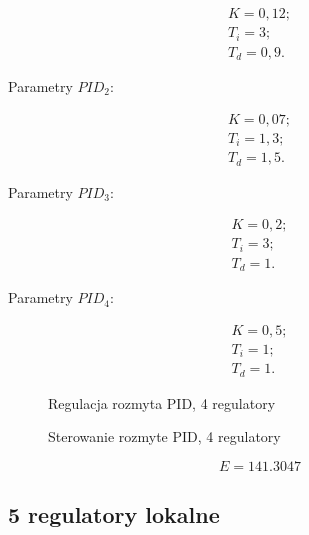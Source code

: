 \begin{equation}
\begin{matrix}
    	K = 0,12;\\
    	T_i = 3;\\
    	T_d = 0,9.
\end{matrix}
\end{equation}

Parametry $PID_2$:

\begin{equation}
\begin{matrix}
    	K = 0,07;\\
    	T_i = 1,3;\\
    	T_d = 1,5.
\end{matrix}
\end{equation}

Parametry $PID_3$:

\begin{equation}
\begin{matrix}
    	K = 0,2;\\
    	T_i = 3;\\
    	T_d = 1.
\end{matrix}
\end{equation}

Parametry $PID_4$:

\begin{equation}
\begin{matrix}
    	K = 0,5;\\
    	T_i = 1;\\
    	T_d = 1.
\end{matrix}
\end{equation}


\begin{figure}[H]
\centering

\caption{Regulacja rozmyta PID, 4 regulatory}
\end{figure}

\begin{figure}[H]
\centering

\caption{Sterowanie rozmyte PID, 4 regulatory}
\end{figure}

\begin{equation}
    E = \num{141,3047}
\end{equation}


\subsection{5 regulatory lokalne}


